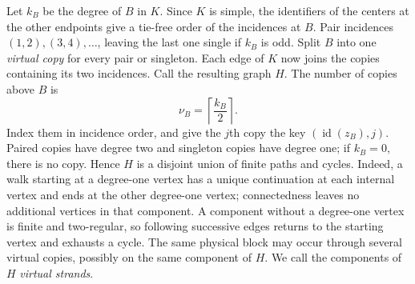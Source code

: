 \documentclass[11pt]{article}
\theoremstyle{definition}
\theoremstyle{remark}
\newcommand{\id}{\operatorname{id}}
\newcommand{\ceil}[1]{\left\lceil #1\right\rceil}
\begin{document}
Let $k_B$ be the degree of $B$ in $K$.  Since $K$ is simple, the identifiers
of the centers at the other endpoints give a tie-free order of the
incidences at $B$.  Pair incidences $(1,2),(3,4),\ldots$, leaving the last
one single if $k_B$ is odd.  Split $B$ into one \emph{virtual copy} for every
pair or singleton.  Each edge of $K$ now joins the copies containing its two
incidences.  Call the resulting graph $H$.  The number of copies above $B$
is
\[
                         \nu_B=\ceil{\frac{k_B}{2}}.            \tag{5.1}
\]
Index them in incidence order, and give the $j$th copy the key
$(\id(z_B),j)$.  Paired copies have degree two and singleton copies have
degree one; if $k_B=0$, there is no copy.  Hence $H$ is a disjoint union of
finite paths and cycles.  Indeed, a walk starting at a degree-one vertex
has a unique continuation at each internal vertex and ends at the other
degree-one vertex; connectedness leaves no additional vertices in that
component.  A component without a degree-one vertex is finite and
two-regular, so following successive edges returns to the starting vertex
and exhausts a cycle.  The same physical block may occur through several
virtual copies, possibly on the same component of $H$.  We call the
components of $H$ \emph{virtual strands}.
\end{document}

